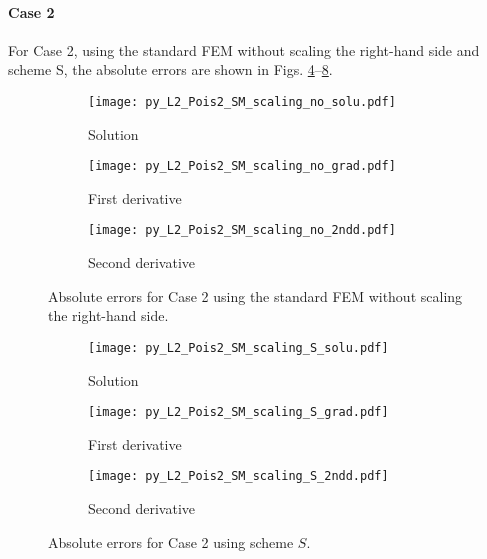 \documentclass[review,3p]{elsarticle}
\begin{document}
\newpage

\paragraph{Case 2}
For Case 2, using the standard FEM without scaling the right-hand side and scheme S, the absolute errors are shown in Figs. \ref{py_L2_Pois2_SM_scaling_no}--\ref{py_L2_Pois2_SM_scaling_S}.

\begin{figure}[!ht]
    \begin{subfigure}{5.5cm}
        \texttt{[image: py\_L2\_Pois2\_SM\_scaling\_no\_solu.pdf]}
        \caption{Solution}
        \label{py_L2_Pois2_SM_scaling_no_solu}
    \end{subfigure}
    \hspace{-0.2cm}
    \begin{subfigure}{5.5cm}
        \texttt{[image: py\_L2\_Pois2\_SM\_scaling\_no\_grad.pdf]}
        \caption{First derivative}
        \label{py_L2_Pois2_SM_scaling_no_grad}
    \end{subfigure}
    \hspace{-0.2cm}
    \begin{subfigure}{5.5cm}
        \texttt{[image: py\_L2\_Pois2\_SM\_scaling\_no\_2ndd.pdf]}
        \caption{Second derivative}
        \label{py_L2_Pois2_SM_scaling_no_2ndd}
    \end{subfigure}
\caption{Absolute errors for Case 2 using the standard FEM without scaling the right-hand side.}
\label{py_L2_Pois2_SM_scaling_no}
\end{figure}

\begin{figure}[!ht]
    \begin{subfigure}{5.5cm}
        \texttt{[image: py\_L2\_Pois2\_SM\_scaling\_S\_solu.pdf]}
        \caption{Solution}
        \label{py_L2_Pois2_SM_scaling_S_solu}
    \end{subfigure}
    \hspace{-0.2cm}
    \begin{subfigure}{5.5cm}
        \texttt{[image: py\_L2\_Pois2\_SM\_scaling\_S\_grad.pdf]}
        \caption{First derivative}
        \label{py_L2_Pois2_SM_scaling_S_grad}
    \end{subfigure}
    \hspace{-0.2cm}
    \begin{subfigure}{5.5cm}
        \texttt{[image: py\_L2\_Pois2\_SM\_scaling\_S\_2ndd.pdf]}
        \caption{Second derivative}
        \label{py_L2_Pois2_SM_scaling_S_2ndd}
    \end{subfigure}
\caption{Absolute errors for Case 2 using scheme $S$.}
\label{py_L2_Pois2_SM_scaling_S}
\end{figure}
\end{document}
